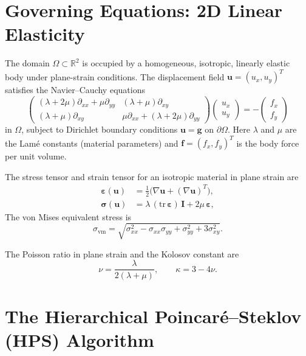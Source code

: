 \documentclass[hidelinks,onefignum,onetabnum]{siamart251216}
\newcommand{\bfu}{\mathbf{u}}
\newcommand{\bff}{\mathbf{f}}
\newcommand{\bfg}{\mathbf{g}}
\newcommand{\bfsigma}{\boldsymbol{\sigma}}
\newcommand{\bfeps}{\boldsymbol{\varepsilon}}
\newcommand{\R}{\mathbb{R}}
\newcommand{\dOmega}{\partial\Omega}
\begin{document}
\section{Governing Equations: 2D Linear Elasticity}
\label{sec:elasticity}

The domain $\Omega \subset \R^2$ is occupied by a homogeneous, isotropic,
linearly elastic body under plane-strain conditions.
The displacement field $\bfu = (u_x, u_y)^T$ satisfies the Navier--Cauchy equations
\begin{equation}\label{eq:navier_cauchy}
  \begin{pmatrix}
    (\lambda+2\mu)\partial_{xx} + \mu\partial_{yy} & (\lambda+\mu)\partial_{xy} \\
    (\lambda+\mu)\partial_{xy} & \mu\partial_{xx} + (\lambda+2\mu)\partial_{yy}
  \end{pmatrix}
  \begin{pmatrix} u_x \\ u_y \end{pmatrix}
  = -\begin{pmatrix} f_x \\ f_y \end{pmatrix}
\end{equation}
in $\Omega$, subject to Dirichlet boundary conditions $\bfu = \bfg$ on $\dOmega$.
Here $\lambda$ and $\mu$ are the Lam\'{e} constants (material parameters) and
$\bff = (f_x, f_y)^T$ is the body force per unit volume.

The stress tensor and strain tensor for an isotropic material in plane strain are
\begin{align}
  \bfeps(\bfu) &= \tfrac{1}{2}\bigl(\nabla \bfu + (\nabla \bfu)^T\bigr),\\
  \bfsigma(\bfu) &= \lambda\,(\mathrm{tr}\,\bfeps)\,\mathbf{I}
                    + 2\mu\,\bfeps,
\end{align}
The von Mises equivalent stress is
\begin{equation}
  \sigma_\text{vm}
  = \sqrt{\sigma_{xx}^2 - \sigma_{xx}\sigma_{yy} + \sigma_{yy}^2 + 3\sigma_{xy}^2}.
\end{equation}

The Poisson ratio in plane strain and the Kolosov constant are
\begin{equation}
  \nu = \frac{\lambda}{2(\lambda+\mu)}, \qquad \kappa = 3 - 4\nu.
\end{equation}

\section{The Hierarchical Poincar\'{e}--Steklov (HPS) Algorithm}
\label{sec:hps}
\end{document}
